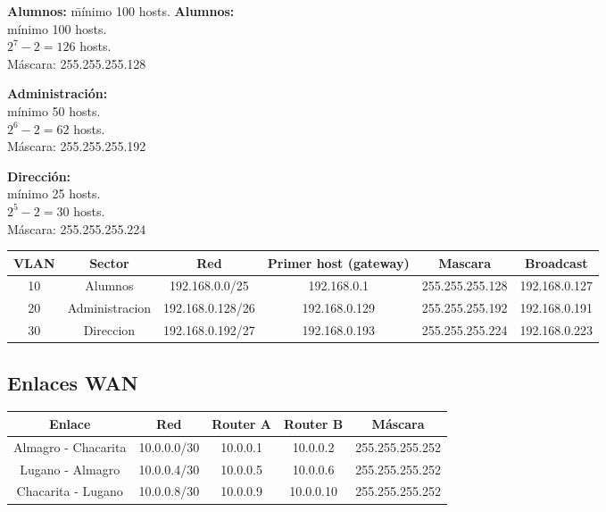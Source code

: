 \documentclass[a4paper,16pt]{article}
\begin{document}
\noindent %
\begin{tabbing}
	\textbf{Alumnos:} \= mínimo 100 hosts. \kill %
	\textbf{Alumnos:} \\ \> mínimo 100 hosts. \\
	\> $2^7 - 2 = 126$ hosts. \\
	\> Máscara: 255.255.255.128 \\\vspace*{0.5cm} %
	
	\textbf{Administración:} \\ \> mínimo 50 hosts. \\
	\> $2^6 - 2 = 62$ hosts. \\
	\> Máscara: 255.255.255.192 \\\vspace*{0.5cm}
	
	\textbf{Dirección:} \\ \> mínimo 25 hosts. \\
	\> $2^5 - 2 = 30$ hosts. \\
	\> Máscara: 255.255.255.224
\end{tabbing}

\vspace{1cm}	

\begin{tabular}{c|c|c|c|c|c}
	\textbf{VLAN} & \textbf{Sector} & \textbf{Red} & \textbf{Primer host (gateway)} & \textbf{Mascara } & \textbf{Broadcast}\\
	\hline
	10 & Alumnos & 192.168.0.0/25 & 192.168.0.1 & 255.255.255.128 & 192.168.0.127\\
	20 & Administracion & 192.168.0.128/26 & 192.168.0.129 & 255.255.255.192 & 192.168.0.191\\
	30 & Direccion & 192.168.0.192/27 & 192.168.0.193 & 255.255.255.224 & 192.168.0.223\\
\end{tabular}

\vspace{1cm}
\subsection*{Enlaces WAN}
\vspace{0.5cm}
\begin{tabular}{c|c|c|c|c}
	\textbf{ Enlace } & \textbf{ Red } & \textbf{ Router A } & \textbf{ Router B } & \textbf{ Máscara }\\
	\hline
	Almagro - Chacarita & 10.0.0.0/30 & 10.0.0.1 & 10.0.0.2 & 255.255.255.252\\
	Lugano - Almagro & 10.0.0.4/30 & 10.0.0.5 & 10.0.0.6 & 255.255.255.252\\
	Chacarita - Lugano & 10.0.0.8/30 & 10.0.0.9 & 10.0.0.10 & 255.255.255.252\\
\end{tabular}
\end{document}
